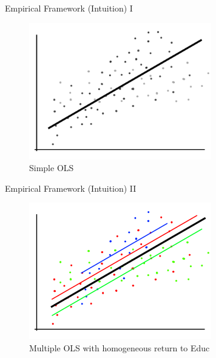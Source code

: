 \documentclass[10pt,ignorenonframetext,]{beamer}
\begin{document}
\begin{frame}{Empirical Framework (Intuition) I}
\protect\hypertarget{empirical-framework-intuition-i}{}

\begin{figure}
\centering
\includegraphics[width=3.125in,height=\textheight]{img/rcmodel001.png}
\caption{Simple OLS}
\end{figure}

\end{frame}

\begin{frame}{Empirical Framework (Intuition) II}
\protect\hypertarget{empirical-framework-intuition-ii}{}

\begin{figure}
\centering
\includegraphics[width=3.125in,height=\textheight]{img/rcmodel002.png}
\caption{Multiple OLS with homogeneous return to Educ}
\end{figure}

\end{frame}
\end{document}
